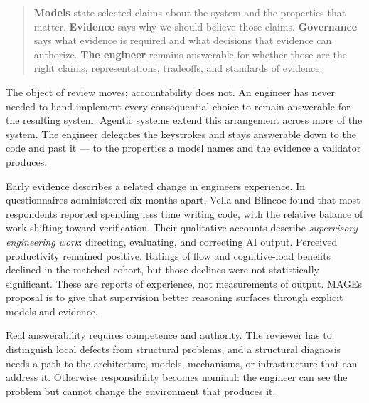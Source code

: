 
\begin{quote}
\textbf{Models} state selected claims about the system and the properties that matter. \textbf{Evidence} says why we should believe those claims. \textbf{Governance} says what evidence is required and what decisions that evidence can authorize. \textbf{The engineer} remains answerable for whether those are the right claims, representations, tradeoffs, and standards of evidence.
\end{quote}


The object of review moves; accountability does not. An engineer has never needed to hand-implement every consequential choice to remain answerable for the resulting system. Agentic systems extend this arrangement across more of the system. The engineer delegates the keystrokes and stays answerable down to the code and past it --- to the properties a model names and the evidence a validator produces.


Early evidence describes a related change in engineers\textquotesingle{} experience. In questionnaires administered six months apart, Vella and Blincoe found that most respondents reported spending less time writing code, with the relative balance of work shifting toward verification. Their qualitative accounts describe \emph{supervisory engineering work}: directing, evaluating, and correcting AI output. Perceived productivity remained positive. Ratings of flow and cognitive-load benefits declined in the matched cohort, but those declines were not statistically significant\citep{vella2026impact}. These are reports of experience, not measurements of output. MAGE\textquotesingle s proposal is to give that supervision better reasoning surfaces through explicit models and evidence.


Real answerability requires competence and authority. The reviewer has to distinguish local defects from structural problems, and a structural diagnosis needs a path to the architecture, models, mechanisms, or infrastructure that can address it. Otherwise responsibility becomes nominal: the engineer can see the problem but cannot change the environment that produces it.


